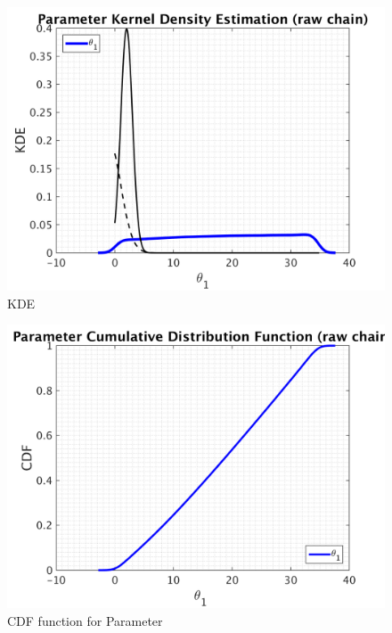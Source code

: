 \begin{figure}[h!]
  
  \centering
   \includegraphics[scale=0.75]{output_900000/simple_ip_kde_raw}
   \caption{ KDE }
\end{figure}

\begin{figure}[h!]
  
  \centering
   \includegraphics[scale=0.75]{output_900000/simple_ip_cdf_raw}
   \caption{CDF function for Parameter }
\end{figure}



